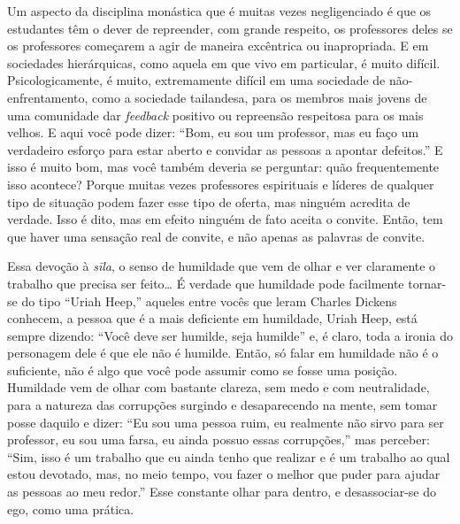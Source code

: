 Um aspecto da disciplina monástica que é muitas vezes negligenciado
é que os estudantes têm o dever de repreender, com grande respeito, os
professores deles se os professores começarem a agir de maneira
excêntrica ou inapropriada. E em sociedades hierárquicas, como aquela
em que vivo em particular, é muito difícil. Psicologicamente, é muito,
extremamente difícil em uma sociedade de não-enfrentamento, como a
sociedade tailandesa, para os membros mais jovens de uma comunidade dar
\textit{feedback} positivo ou repreensão respeitosa para os mais
velhos. E aqui você pode dizer: “Bom, eu sou um professor, mas eu faço
um verdadeiro esforço para estar aberto e convidar as pessoas a apontar
defeitos.” E isso é muito bom, mas você também deveria se perguntar:
quão frequentemente isso acontece? Porque muitas vezes professores
espirituais e líderes de qualquer tipo de situação podem fazer esse
tipo de oferta, mas ninguém acredita de verdade. Isso é dito, mas em
efeito ninguém de fato aceita o convite. Então, tem que haver uma
sensação real de convite, e não apenas as palavras de convite. 

Essa devoção à \textit{sīla}, o senso de humildade que vem de
olhar e ver claramente o trabalho que precisa ser feito\ldots{} É verdade que
humildade pode facilmente tornar-se do tipo “Uriah Heep,” aqueles entre
vocês que leram Charles Dickens conhecem, a pessoa que é a mais
deficiente em humildade, Uriah Heep, está sempre dizendo: “Você deve
ser humilde, seja humilde” e, é claro, toda a ironia do personagem dele
é que ele não é humilde. Então, só falar em humildade não é o
suficiente, não é algo que você pode assumir como se fosse uma posição.
Humildade vem de olhar com bastante clareza, sem medo e com
neutralidade, para a natureza das corrupções surgindo e desaparecendo
na mente, sem tomar posse daquilo e dizer: “Eu sou uma pessoa ruim, eu
realmente não sirvo para ser professor, eu sou uma farsa, eu ainda
possuo essas corrupções,” mas perceber: “Sim, isso é um trabalho que eu
ainda tenho que realizar e é um trabalho ao qual estou devotado, mas,
no meio tempo, vou fazer o melhor que puder para ajudar as pessoas ao
meu redor.” Esse constante olhar para dentro, e desassociar-se do ego,
como uma prática. 

